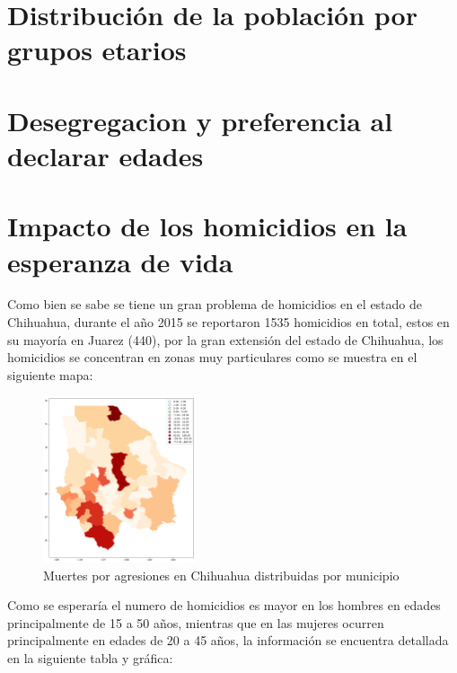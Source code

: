 \documentclass[fontsize=11pt]{article}
\begin{document}
\section*{Distribución de la población por grupos etarios}
\section*{Desegregacion y preferencia al declarar edades}
\section*{Impacto de los homicidios en la esperanza de vida}
Como bien se sabe se tiene un gran problema de homicidios en el estado de Chihuahua, durante el año 2015 se reportaron\cite{DAT} 1535 homicidios en total, estos en su mayoría en Juarez (440), por la gran extensión del estado de Chihuahua, los homicidios se concentran en zonas muy particulares como se muestra en el siguiente mapa: 
\begin{figure}[H]
\centering
\includegraphics[width=0.4\textwidth]{map}
\caption{Muertes por agresiones en Chihuahua distribuidas por municipio}
\end{figure}
Como se esperaría el numero de homicidios es mayor en los hombres en edades principalmente de 15 a 50 años, mientras que en las mujeres ocurren principalmente en edades de 20 a 45 años, la información se encuentra detallada en la siguiente tabla y gráfica: 
\end{document}
